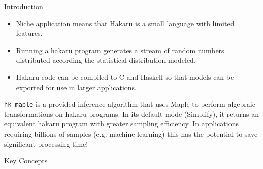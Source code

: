 \documentclass[22pt]{beamer}
\begin{document}
\begin{frame}[fragile]
\begin{textblock}{5}
\begin{block}{\Large{Introduction}}
{\begin{itemize}
    \item Niche application means that Hakaru is a small language with limited features.
    \item Running a hakaru program generates a stream of random numbers distributed according the statistical distribution modeled.
    \item Hakaru code can be compiled to C and Haskell so that models can be exported for use in larger applications.
\end{itemize}

}

\bigskip
\scriptsize{{\tt \scriptsize{hk-maple}} is a provided inference algorithm that uses Maple to perform algebraic transformations on hakaru programs. In its default mode (Simplify), it returns an equivalent hakaru program with greater sampling efficiency. In applications requiring billions of samples (e.g. machine learning) this has the potential to save significant processing time!}

\end{block}


\begin{block}{\Large{Key Concepts}}
\justifying


\end{block}
\end{textblock}
\end{frame}
\end{document}
